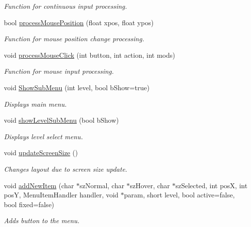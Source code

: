 \begin{DoxyCompactItemize}
\begin{DoxyCompactList}\small\item\em Function for continuous input processing. \end{DoxyCompactList}\item 
bool \hyperlink{class_menu_a98aa69e5ed8eb5a80cd19b4dd6c9482c}{process\+Mouse\+Position} (float xpos, float ypos)
\begin{DoxyCompactList}\small\item\em Function for mouse position change processing. \end{DoxyCompactList}\item 
void \hyperlink{class_menu_acf97e448b5fbe3fefca5e6459e841438}{process\+Mouse\+Click} (int button, int action, int mods)
\begin{DoxyCompactList}\small\item\em Function for mouse input processing. \end{DoxyCompactList}\item 
void \hyperlink{class_menu_adc7835954b600003eea158e03a0108d4}{Show\+Sub\+Menu} (int level, bool b\+Show=true)
\begin{DoxyCompactList}\small\item\em Displays main menu. \end{DoxyCompactList}\item 
void \hyperlink{class_menu_a0f4426bd7323a84c24fc764a76f0b557}{show\+Level\+Sub\+Menu} (bool b\+Show)
\begin{DoxyCompactList}\small\item\em Displays level select menu. \end{DoxyCompactList}\item 
void \hyperlink{class_menu_a6599ad763c91acb0a1683be542f8e095}{update\+Screen\+Size} ()\hypertarget{class_menu_a6599ad763c91acb0a1683be542f8e095}{}\label{class_menu_a6599ad763c91acb0a1683be542f8e095}

\begin{DoxyCompactList}\small\item\em Changes layout due to screen size update. \end{DoxyCompactList}\item 
void \hyperlink{class_menu_a085252eb220290c5492a3afca26fa2a1}{add\+New\+Item} (char $\ast$sz\+Normal, char $\ast$sz\+Hover, char $\ast$sz\+Selected, int posX, int posY, Menu\+Item\+Handler handler, void $\ast$param, short level, bool active=false, bool fixed=false)\hypertarget{class_menu_a085252eb220290c5492a3afca26fa2a1}{}\label{class_menu_a085252eb220290c5492a3afca26fa2a1}

\begin{DoxyCompactList}\small\item\em Adds button to the menu. \end{DoxyCompactList}\end{DoxyCompactItemize}
